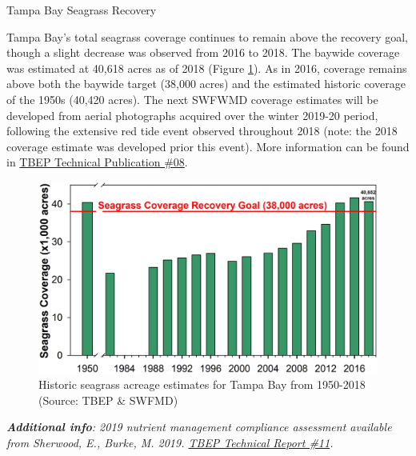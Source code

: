 \documentclass[final,t]{beamer}\usepackage[]{graphicx}\usepackage[]{color}
\begin{document}
\begin{frame}
\begin{columns}[t]
\begin{column}{.63\linewidth}
\begin{block}{Tampa Bay Seagrass Recovery}
\begin{minipage}{0.5\textwidth}
\footnotesize
Tampa Bay's total seagrass coverage continues to remain above the recovery goal, though a slight decrease was observed from 2016 to 2018. The baywide coverage was estimated at 40,618 acres as of 2018 (Figure \ref{fig:sgtrnd}). As in 2016, coverage remains above both the baywide target (38,000 acres) and the estimated historic coverage of the 1950s (40,420 acres). The next SWFWMD coverage estimates will be developed from aerial photographs acquired over the winter 2019-20 period, following the extensive red tide event observed throughout 2018 (note: the 2018 coverage estimate was developed prior this event). More information can be found in \href{(https://tbeptech.org/TBEP_TECH_PUBS/2016/TBEP_08_16_2016_Seagrass_Transect_Summary_Report.pdf}{TBEP Technical Publication \#08}.
\end{minipage}
\hspace{0.01in}
\begin{minipage}{0.45\textwidth}
\begin{figure}
\includegraphics[width=\textwidth, trim = 0cm 0cm 0cm -2cm]{www/Seagrass_Acreage_1950_2018.png}
\caption{\footnotesize Historic seagrass acreage estimates for Tampa Bay from 1950-2018 (Source: TBEP \& SWFMD)}
\label{fig:sgtrnd}
\end{figure}
\end{minipage}
\end{block}

\vspace{0.1in}

\footnotesize \textit{\textbf{Additional info}: 2019 nutrient management compliance assessment available from Sherwood, E., Burke, M. 2019. \href{http://www.tbeptech.org/TBEP_TECH_PUBS/2019/TBEP_11-19_TBNMC_2018_RA_Annual_Assessment.pdf}{TBEP Technical Report \#11}.} \\

\end{column}

\end{columns}

\end{frame}
\end{document}
